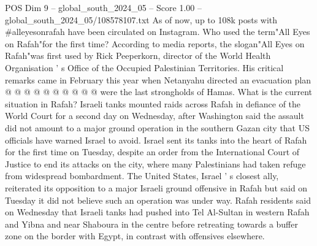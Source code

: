 \begin{textsample}{POS Dim 9 – global\_south\_2024\_05 – Score 1.00 – global\_south\_2024\_05/108578107.txt}
As of now, up to 108k posts with \#alleyesonrafah have been circulated on Instagram.
Who used the term"All Eyes on Rafah"for the first time?
According to media reports, the slogan"All Eyes on Rafah"was first used by Rick Peeperkorn, director of the World Health Organisation ' s Office of the Occupied Palestinian Territories.
His critical remarks came in February this year when Netanyahu directed an evacuation plan @ @ @ @ @ @ @ @ @ @ were the last strongholds of Hamas.
What is the current situation in Rafah?
Israeli tanks mounted raids across Rafah in defiance of the World Court for a second day on Wednesday, after Washington said the assault did not amount to a major ground operation in the southern Gazan city that US officials have warned Israel to avoid.
Israel sent its tanks into the heart of Rafah for the first time on Tuesday, despite an order from the International Court of Justice to end its attacks on the city, where many Palestinians had taken refuge from widespread bombardment.
The United States, Israel ' s closest ally, reiterated its opposition to a major Israeli ground offensive in Rafah but said on Tuesday it did not believe such an operation was under way.
Rafah residents said on Wednesday that Israeli tanks had pushed into Tel Al-Sultan in western Rafah and Yibna and near Shaboura in the centre before retreating towards a buffer zone on the border with Egypt, in contrast with offensives elsewhere.

\end{textsample}
